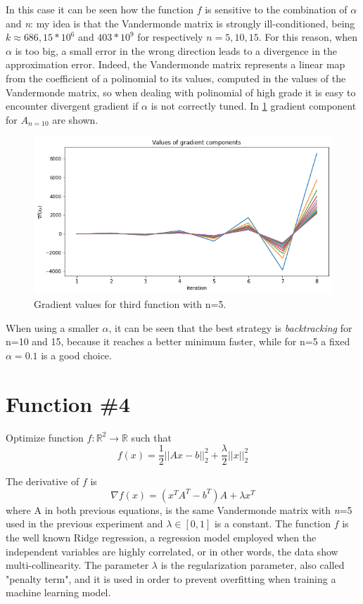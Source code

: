 \documentclass[a4paper,10pt]{report}
\begin{document}
In this case it can be seen how the function $f$ is sensitive to the combination of $\alpha$ and \emph{n}: my idea is that the Vandermonde matrix is strongly ill-conditioned, being $k\approx 686, 15*10^6$ and $403*10^9$ for respectively $n=5, 10, 15$.
For this reason, when $\alpha$ is too big, a small error in the wrong direction leads to a divergence in the approximation error.
Indeed, the Vandermonde matrix represents a linear map from the coefficient of a polinomial to its values, computed in the values of the Vandermonde matrix, so when dealing with polinomial of high grade it is easy to encounter divergent gradient if $\alpha$ is not correctly tuned.
In \ref{fig:expgd} gradient component for $A_{n=10}$ are shown.
\begin{figure}[!htb]
  \center
  \includegraphics[width=0.8\linewidth]{exploding_gd.png}
  \caption{Gradient values for third function with n=5.}
  \label{fig:expgd}
\end{figure}

When using a smaller $\alpha$, it can be seen that the best strategy is \emph{backtracking} for n=10 and 15, because it reaches a better minimum faster, while for n=5 a fixed $\alpha=0.1$ is a good choice.
\newpage
\section{Function \#4}
Optimize function $f:\mathbb{R}^2 \rightarrow \mathbb{R}$ such that
\begin{equation}
  f(x)=\frac{1}{2}||Ax-b||_2^2 + \frac{\lambda}{2}||x||_2^2
\end{equation}

The derivative of $f$ is
\begin{equation}
  \nabla f(x)= (x^TA^T-b^T)A + \lambda x^T
\end{equation}
where A in both previous equations, is the same Vandermonde matrix with \emph{n}=5 used in the previous experiment and $\lambda\in [0,1]$ is a constant.
The function $f$ is the well known Ridge regression, a regression model employed when the independent variables are highly correlated, or in other words, the data show multi-collinearity.
The parameter $\lambda$ is the regularization parameter, also called "penalty term", and it is used in order to prevent overfitting when training a machine learning model.
\end{document}
